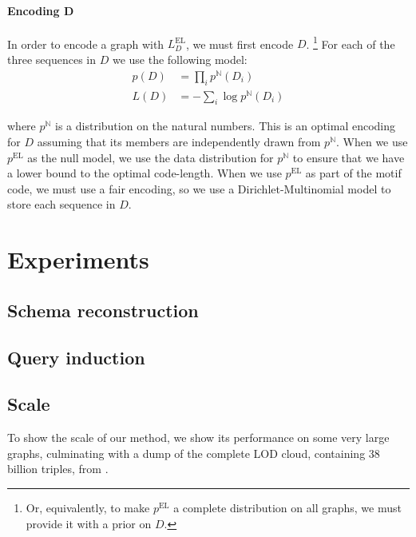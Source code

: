 \documentclass[11pt]{article}
\newcommand{\N}{{\mathbb N}}
\begin{document}
 
 \paragraph{Encoding D} In order to encode a graph with $L^\text{EL}_D$, we must first encode $D$. \footnote{Or, equivalently, to make $p^\text{EL}$ a complete distribution on all graphs, we must provide it with a prior on $D$.} For each of the three sequences in $D$ we use the following model:
\begin{align*}
 p(D) &= \prod_i p^{\N}(D_i) \\
 L(D) &= - \sum_i \log p^{\N}(D_i)
\end{align*}

where $p^{\N}$ is a distribution on the natural numbers. This is an optimal encoding for $D$ assuming that its members are independently drawn from $p^{\N}$. When we use $p^\text{EL}$ as the null model, we use the data distribution for $p^{\N}$ to ensure that we have a lower bound to the optimal code-length. When we use $p^\text{EL}$ as part of the motif code, we must use a fair encoding, so we use a Dirichlet-Multinomial model to store each sequence in $D$.
 
\section{Experiments}



\subsection{Schema reconstruction}

\subsection{Query induction}

\subsection{Scale}

To show the scale of our method, we show its performance on some very large graphs, culminating with a dump of the complete LOD cloud, containing 38 billion triples, from \cite{}.
\end{document}
